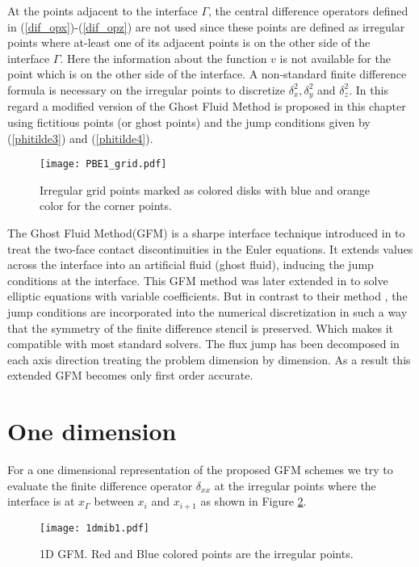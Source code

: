 At the points adjacent to the interface $\Gamma$, the central difference operators defined in (\ref{dif_opx})-(\ref{dif_opz}) are not used since these points are defined as irregular points where at-least one of its adjacent points is on the other side of the interface $\Gamma$. 
Here the information about the function $v$ is not available for the point which is on the other side of the interface. A non-standard finite difference formula is necessary on the irregular points to discretize $\delta_x^2,\delta_y^2$ and $\delta_z^2$.  In this regard a modified version of the Ghost Fluid Method is proposed in this chapter using fictitious points (or ghost points) and the jump conditions given by (\ref{phitilde3}) and (\ref{phitilde4}).

\begin{figure}[!ht]
	\centering
	\texttt{[image: PBE1\_grid.pdf]}
	\caption{Irregular grid points marked as colored disks with blue and orange color for the corner points.}
	\label{fig_irgpoints}
\end{figure}


The Ghost Fluid Method(GFM) is a sharpe interface technique introduced in  \cite{Fedkiw1999} to treat the two-face contact discontinuities in the Euler equations. It extends values across the interface into an artificial fluid (ghost fluid), inducing the jump conditions at the interface. This GFM method was later extended in \cite{Liu2000} to solve elliptic equations with variable coefficients. But in contrast to their method \cite{Liu2000}, the jump conditions are incorporated into the numerical discretization in such a way that the symmetry of the finite difference stencil is preserved. Which makes it compatible with most standard solvers. The flux jump has been decomposed in each axis direction treating the problem dimension by dimension. As a result this extended GFM becomes only first order accurate.   


\section{One dimension}

For a one dimensional representation of the proposed GFM schemes we try to evaluate the finite difference operator $\delta_{xx}$ at the irregular points where the interface is at $x_\Gamma$ between $x_i$ and $x_{i+1}$ as shown in Figure \ref{fig_1}.  %
\begin{figure}[ht]
\begin{center}
\texttt{[image: 1dmib1.pdf]}\hspace{10mm}
\caption{1D GFM. Red and Blue colored points are the irregular points.}
\label{fig_1}
\end{center}
\end{figure}

